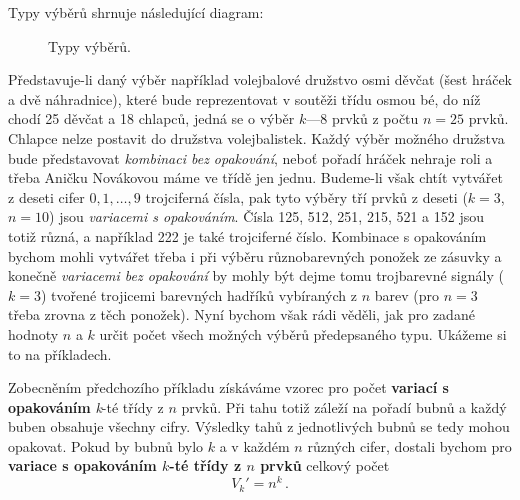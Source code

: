 {      Typy výběrů shrnuje následující diagram:
      \begin{figure}[ht!] %
        \centering
        
        \caption{Typy výběrů. \cite[s.~201]{Musilova2009MA1}}
        \label{mai_fig021}
      \end{figure}

      Představuje-li daný výběr například volejbalové družstvo osmi děvčat (šest hráček a dvě 
      náhradnice), které bude reprezentovat v soutěži třídu osmou bé, do níž chodí \num{25} děvčat 
      a \num{18} chlapců, jedná se o výběr \(k — 8\) prvků z počtu \(n = 25\) prvků. Chlapce nelze 
      postavit do družstva volejbalistek. Každý výběr možného družstva bude představovat 
      \emph{kombinaci bez opakování}, neboť pořadí hráček nehraje roli a třeba Aničku Novákovou 
      máme ve třídě jen jednu. Budeme-li však chtít vytvářet z deseti cifer \(0, 1, \ldots, 9\) 
      trojciferná čísla, pak tyto výběry tří prvků z deseti (\(k = 3\), \(n = 10\)) jsou 
      \emph{variacemi s opakováním}. Čísla \num{125}, \num{512}, \num{251}, \num{215}, \num{521} a 
      \num{152} jsou totiž různá, a například \num{222} je také trojciferné číslo. Kombinace s 
      opakováním bychom mohli vytvářet třeba i při výběru různobarevných ponožek ze zásuvky a 
      konečně \emph{variacemi bez opakování} by mohly být dejme tomu trojbarevné signály (\(k = 
      3\)) tvořené trojicemi barevných hadříků vybíraných z \(n\) barev (pro \(n = 3\) třeba zrovna 
      z těch ponožek). Nyní bychom však rádi věděli, jak pro zadané hodnoty \(n\) a \(k\) určit 
      počet všech možných výběrů předepsaného typu. Ukážeme si to na příkladech.

      
      
      Zobecněním předchozího příkladu získáváme vzorec pro počet \textbf{variací s opakováním} 
      \emph{k}-té třídy z \(n\) prvků. Při tahu totiž záleží na pořadí bubnů a každý buben obsahuje 
      všechny cifry. Výsledky tahů z jednotlivých bubnů se tedy mohou opakovat. Pokud by bubnů bylo 
      \(k\) a v každém \(n\) různých cifer, dostali bychom pro \textbf{variace s opakováním 
      \(k\)-té třídy z \(n\) prvků} celkový počet
      \begin{equation}\label{mai:eq007}
        \boxed{V_k' = n^k}\, .
      \end{equation}

}
